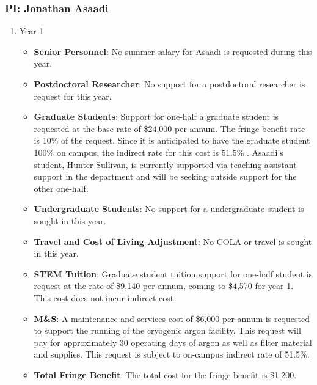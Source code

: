 \newpage

\subsubsection{\bf PI: Jonathan Asaadi}

\begin{enumerate}

\item{Year 1}

\begin{itemize}[noitemsep,nolistsep]

\item{{\bf Senior Personnel}: No summer salary for Asaadi is requested during this year.}

\item {{\bf Postdoctoral Researcher}: No support for a postdoctoral researcher is request for this year.} 

\item{{\bf Graduate Students}: Support for one-half a graduate student is requested at the base rate of \$24,000 per annum.   The fringe benefit rate is 10\% of the request.  Since it is anticipated to have the graduate student 100\% on campus, the indirect rate for this cost is 51.5\% .   Asaadi’s student, Hunter Sullivan, is currently supported via teaching assistant support in the department and will be seeking outside support for the other one-half.}

\item {{\bf Undergraduate Students}: No support for a undergraduate student is sought in this year.}

\item{{\bf Travel and Cost of Living Adjustment}: No COLA or travel is sought in this year.}

\item {{\bf STEM Tuition}: Graduate student tuition support for one-half student is request at the rate of \$9,140 per annum, coming to \$4,570 for year 1.  This cost does not incur indirect cost.}

\item {{\bf M\&S}: A maintenance and services cost of \$6,000 per annum is requested to support the running of the cryogenic argon facility. This request will pay for approximately 30 operating days of argon as well as filter material and supplies.    This request is subject to on-campus indirect rate of 51.5\%.}

\item {{\bf Total Fringe Benefit}: The total cost for the fringe benefit is \$1,200.}


\end{itemize}
\end{enumerate}
